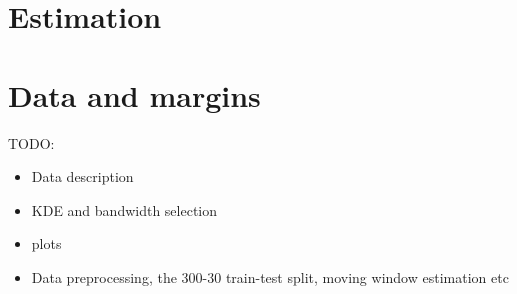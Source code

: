 \documentclass[11pt,a4paper,english]{article}
\begin{document}
%
%




\section{Estimation}



\section{Data and margins}
TODO:
\begin{itemize}
    \item Data description
    \item KDE and bandwidth selection
    \item plots
    \item Data preprocessing, the 300-30 train-test split, moving window estimation etc
\end{itemize}





\end{document}
